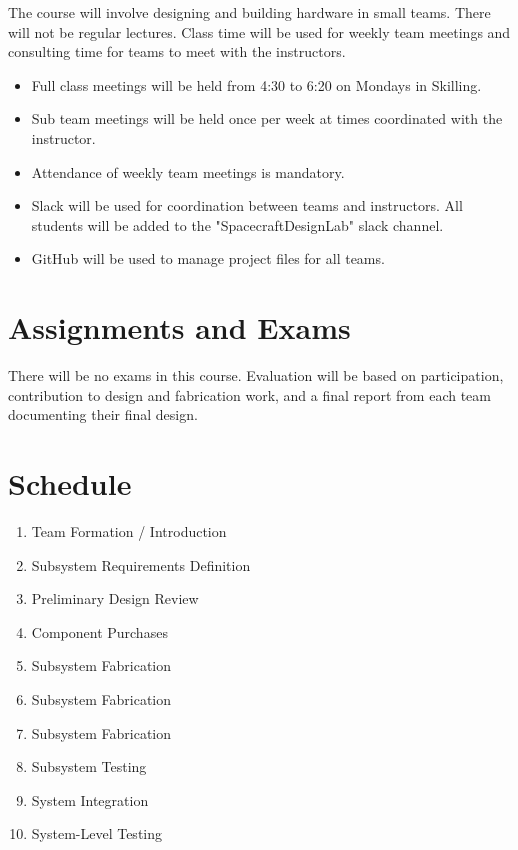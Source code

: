 \documentclass[11pt,letterpaper]{article}
\begin{document}
The course will involve designing and building hardware in small teams. There will not be regular lectures. Class time will be used for weekly team meetings and consulting time for teams to meet with the instructors.

\begin{itemize}
	\item Full class meetings will be held from 4:30 to 6:20 on Mondays in Skilling.
	\item Sub team meetings will be held once per week at times coordinated with the instructor.
	\item Attendance of weekly team meetings is mandatory.
	\item Slack will be used for coordination between teams and instructors. All students will be added to the "SpacecraftDesignLab" slack channel.
	\item GitHub will be used to manage project files for all teams.
\end{itemize}

\section*{Assignments and Exams}

There will be no exams in this course. Evaluation will be based on participation, contribution to design and fabrication work, and a final report from each team documenting their final design.

\section*{Schedule}

\begin{enumerate}[label=\textbf{Week \arabic*:},leftmargin=3.5\parindent]
	\item Team Formation / Introduction
	\item Subsystem Requirements Definition
	\item Preliminary Design Review
	\item Component Purchases
	\item Subsystem Fabrication
	\item Subsystem Fabrication
	\item Subsystem Fabrication
	\item Subsystem Testing
	\item System Integration
	\item System-Level Testing
\end{enumerate}
\end{document}

